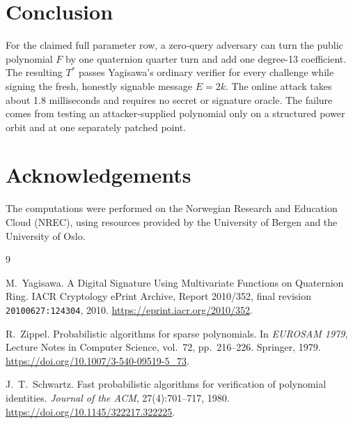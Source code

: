 \documentclass[10pt,a4paper]{article}
\begin{document}
\section{Conclusion}

For the claimed full parameter row, a zero-query adversary can turn the
public polynomial $F$ by one quaternion quarter turn and add one degree-13
coefficient.  The resulting $T^*$ passes Yagisawa's ordinary verifier for
every challenge while signing the fresh, honestly signable message $E=2k$.
The online attack takes about 1.8 milliseconds and requires no secret or
signature oracle.  The failure comes from testing an attacker-supplied
polynomial only on a structured power orbit and at one separately patched
point.

\section*{Acknowledgements}
The computations were performed on the Norwegian Research and Education Cloud (NREC), using resources provided by the University of Bergen and the University of Oslo.

\begin{thebibliography}{9}

M.~Yagisawa.
\newblock A Digital Signature Using Multivariate Functions on Quaternion Ring.
\newblock IACR Cryptology ePrint Archive, Report 2010/352, final revision
\texttt{20100627:124304}, 2010.
\newblock \url{https://eprint.iacr.org/2010/352}.

R.~Zippel.
\newblock Probabilistic algorithms for sparse polynomials.
\newblock In \emph{EUROSAM 1979}, Lecture Notes in Computer Science, vol.~72,
pp.~216--226. Springer, 1979.
\newblock \url{https://doi.org/10.1007/3-540-09519-5_73}.

J.~T.~Schwartz.
\newblock Fast probabilistic algorithms for verification of polynomial
identities.
\newblock \emph{Journal of the ACM}, 27(4):701--717, 1980.
\newblock \url{https://doi.org/10.1145/322217.322225}.

\end{thebibliography}
\end{document}
